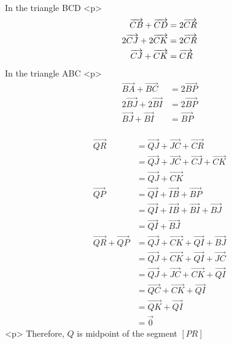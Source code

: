 In the triangle BCD
<p>
$$\begin{aligned}
\gdef\vec#1{\overrightarrow{#1}}

\vec{CB}+\vec{CD} &= 2\vec{CR}\\
2\vec{CJ}+2\vec{CK} &= 2\vec{CR}\\
\vec{CJ}+\vec{CK} &= \vec{CR}\\
\end{aligned}$$
In the triangle ABC
<p>
$$\begin{aligned}

\vec{BA}+\vec{BC} &= 2\vec{BP}\\
2\vec{BJ}+2\vec{BI} &= 2\vec{BP}\\
\vec{BJ}+\vec{BI} &= \vec{BP}\\
\end{aligned}$$

$$\begin{aligned}

\vec{QR} &= \vec{QJ} + \vec{JC} + \vec{CR}\\
&= \vec{QJ} + \vec{JC} + \vec{CJ} + \vec{CK}\\
&= \vec{QJ} + \vec{CK}\\

\vec{QP} &= \vec{QI} + \vec{IB} + \vec{BP}\\
&= \vec{QI} + \vec{IB} + \vec{BI} + \vec{BJ}\\
&= \vec{QI} + \vec{BJ}\\

\vec{QR}+\vec{QP} &=  \vec{QJ} + \vec{CK} + \vec{QI} + \vec{BJ}\\
&= \vec{QJ} + \vec{CK} + \vec{QI} + \vec{JC}\\
&= \vec{QJ} + \vec{JC} + \vec{CK} + \vec{QI}\\
&= \vec{QC} + \vec{CK} + \vec{QI}\\
&= \vec{QK} + \vec{QI}\\
&= \vec{0}
\end{aligned}$$
<p>
Therefore, $Q$ is midpoint of the segment $[PR]$
